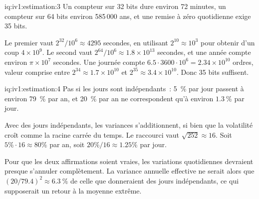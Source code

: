 \begin{solution}{iq:iv1:estimation:3}
Un compteur sur 32 bits dure environ 72 minutes, un compteur sur 64 bits environ 585\,000 ans, et une remise à zéro quotidienne exige 35 bits.

Le premier vaut $2^{32}/10^6 \approx 4295$ secondes, en utilisant $2^{10} \approx 10^3$ pour obtenir d'un coup $4 \times 10^9$. Le second vaut $2^{64}/10^6 \approx 1.8 \times 10^{13}$ secondes, et une année compte environ $\pi \times 10^7$ secondes. Une journée compte $6.5 \cdot 3600 \cdot 10^6 = 2.34 \times 10^{10}$ ordres, valeur comprise entre $2^{34} \approx 1.7 \times 10^{10}$ et $2^{35} \approx 3.4 \times 10^{10}$. Donc 35 bits suffisent.

\end{solution}

\begin{solution}{iq:iv1:estimation:4}
Pas si les jours sont indépendants~: 5~\% par jour passent à environ 79~\% par an, et 20~\% par an ne correspondent qu'à environ $1.3~\%$ par jour.

Avec des jours indépendants, les variances s'additionnent, si bien que la volatilité croît comme la racine carrée du temps. Le raccourci vaut $\sqrt{252} \approx 16$. Soit $5\% \cdot 16 \approx 80\%$ par an, soit $20\%/16 \approx 1.25\%$ par jour.

Pour que les deux affirmations soient vraies, les variations quotidiennes devraient presque s'annuler complètement. La variance annuelle effective ne serait alors que $(20/79.4)^2 \approx 6.3~\%$ de celle que donneraient des jours indépendants, ce qui supposerait un retour à la moyenne extrême.

\end{solution}

